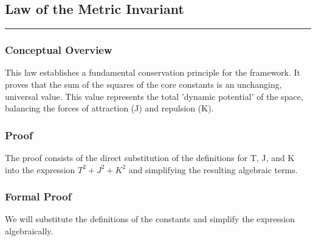 
\subsection*{Law of the Metric Invariant}
\hrule
\vspace{0.3cm}
\vspace{0.5cm}

\subsubsection*{Conceptual Overview}
This law establishes a fundamental conservation principle for the framework. It proves that the sum of the squares of the core constants is an unchanging, universal value. This value represents the total 'dynamic potential' of the space, balancing the forces of attraction (J) and repulsion (K).

\subsubsection*{Proof}
The proof consists of the direct substitution of the definitions for T, J, and K into the expression $T^2 + J^2 + K^2$ and simplifying the resulting algebraic terms.

\subsubsection*{Formal Proof}
We will substitute the definitions of the constants and simplify the expression algebraically.

